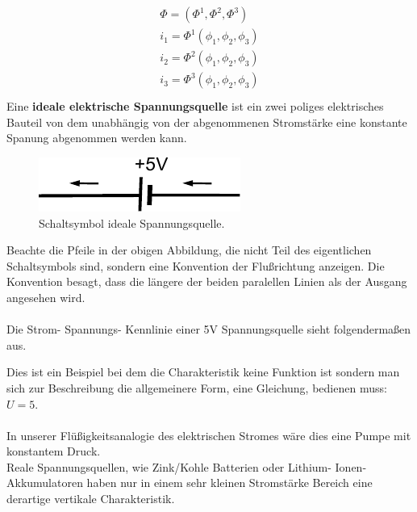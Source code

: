 \documentclass[11pt,a4paper,leqno]{report}
\numberwithin{equation}{chapter}
\begin{document}
\begin{align} 
\begin{split}
\Phi = (\Phi^1, \Phi^2, \Phi^3)\\
i_1 = \Phi^1(\phi_1,\phi_2,\phi_3)\\
i_2 = \Phi^2(\phi_1,\phi_2,\phi_3)\\
i_3 = \Phi^3(\phi_1,\phi_2,\phi_3)\\
\end{split}
\end{align}
\noindent
Eine \textbf{ideale elektrische Spannungsquelle} ist ein zwei poliges elektrisches Bauteil von dem unabh\"angig von der abgenommenen Stromst\"arke eine konstante Spanung abgenommen werden kann. 
\begin{figure}[H]
	\begin{center}
		\includegraphics[scale=1]{ideal.pdf}
		\caption{Schaltsymbol ideale Spannungsquelle.}
	\end{center}
\end{figure}
\noindent
Beachte die Pfeile in der obigen Abbildung, die nicht Teil des eigentlichen Schaltsymbols sind, sondern eine Konvention der Flu\ss{}richtung anzeigen. Die Konvention besagt, dass die l\"angere der beiden paralellen Linien als der Ausgang angesehen wird.\\
\\
Die Strom- Spannungs- Kennlinie einer 5V Spannungsquelle sieht folgenderma\ss{}en aus.
\begin{figure}[H]
\end{figure}
\noindent
Dies ist ein Beispiel bei dem die Charakteristik keine Funktion ist sondern man sich zur Beschreibung die allgemeinere Form, eine Gleichung, bedienen muss: $U=5$.\\
\\
In unserer Fl\"u\ss{}igkeitsanalogie des elektrischen Stromes w\"are dies eine Pumpe mit konstantem Druck.\\
Reale Spannungsquellen, wie Zink/Kohle Batterien oder Lithium- Ionen- Akkumulatoren haben nur in einem sehr kleinen Stromst\"arke Bereich eine derartige vertikale Charakteristik.\\
\\
\end{document}
